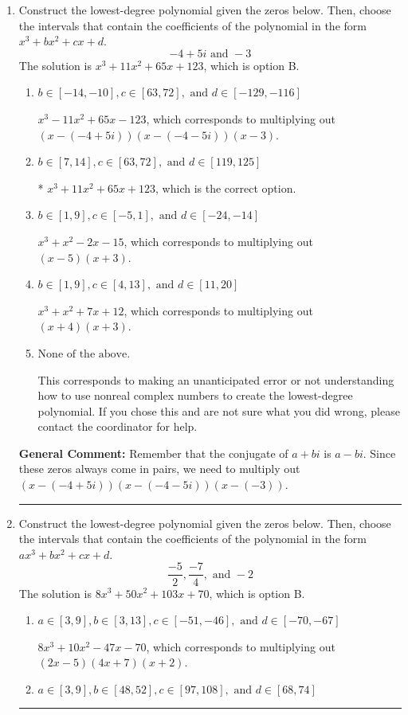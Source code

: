 \documentclass{extbook}[14pt]
\newcommand{\litem}[1]{\item #1

\rule{\textwidth}{0.4pt}}
\begin{document}
\begin{enumerate}\litem{
Construct the lowest-degree polynomial given the zeros below. Then, choose the intervals that contain the coefficients of the polynomial in the form $x^3+bx^2+cx+d$.
\[ -4 + 5 i \text{ and } -3 \]The solution is \( x^{3} +11 x^{2} +65 x + 123 \), which is option B.\begin{enumerate}[label=\Alph*.]
\item \( b \in [-14, -10], c \in [63, 72], \text{ and } d \in [-129, -116] \)

$x^{3} -11 x^{2} +65 x -123$, which corresponds to multiplying out $(x-(-4 + 5 i))(x-(-4 - 5 i))(x -3)$.
\item \( b \in [7, 14], c \in [63, 72], \text{ and } d \in [119, 125] \)

* $x^{3} +11 x^{2} +65 x + 123$, which is the correct option.
\item \( b \in [1, 9], c \in [-5, 1], \text{ and } d \in [-24, -14] \)

$x^{3} + x^{2} -2 x -15$, which corresponds to multiplying out $(x -5)(x + 3)$.
\item \( b \in [1, 9], c \in [4, 13], \text{ and } d \in [11, 20] \)

$x^{3} + x^{2} +7 x + 12$, which corresponds to multiplying out $(x + 4)(x + 3)$.
\item \( \text{None of the above.} \)

This corresponds to making an unanticipated error or not understanding how to use nonreal complex numbers to create the lowest-degree polynomial. If you chose this and are not sure what you did wrong, please contact the coordinator for help.
\end{enumerate}

\textbf{General Comment:} Remember that the conjugate of $a+bi$ is $a-bi$. Since these zeros always come in pairs, we need to multiply out $(x-(-4 + 5 i))(x-(-4 - 5 i))(x-(-3))$.
}
\litem{
Construct the lowest-degree polynomial given the zeros below. Then, choose the intervals that contain the coefficients of the polynomial in the form $ax^3+bx^2+cx+d$.
\[ \frac{-5}{2}, \frac{-7}{4}, \text{ and } -2 \]The solution is \( 8x^{3} +50 x^{2} +103 x + 70 \), which is option B.\begin{enumerate}[label=\Alph*.]
\item \( a \in [3, 9], b \in [3, 13], c \in [-51, -46], \text{ and } d \in [-70, -67] \)

$8x^{3} +10 x^{2} -47 x -70$, which corresponds to multiplying out $(2x -5)(4x + 7)(x + 2)$.
\item \( a \in [3, 9], b \in [48, 52], c \in [97, 108], \text{ and } d \in [68, 74] \)


\end{enumerate}}
\end{enumerate}
\end{document}
